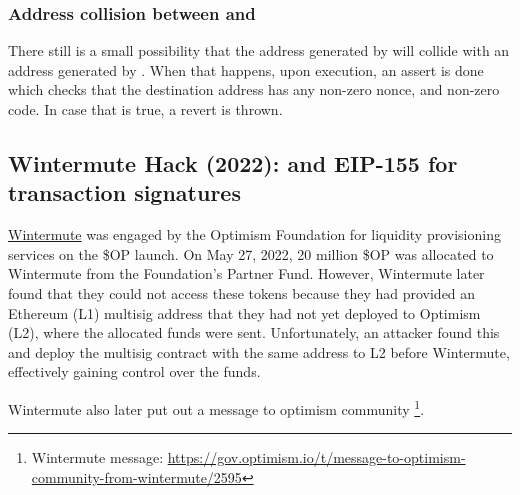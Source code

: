 \subsubsection{Address collision between  and }
There still is a small possibility that the address generated by  will collide with an address generated by . When that happens, upon execution, an assert is done which checks that the destination address has any non-zero nonce, and non-zero code. In case that is true, a revert is thrown.

\subsection{Wintermute Hack (2022):  and EIP-155 for transaction signatures}
\href{https://www.wintermute.com/}{Wintermute} was engaged by the Optimism Foundation for liquidity provisioning services on the \$OP launch. On May 27, 2022, 20 million \$OP was allocated to Wintermute from the Foundation's Partner Fund. However, Wintermute later found that they could not access these tokens because they had provided an Ethereum (L1) multisig address that they had not yet deployed to Optimism (L2), where the allocated funds were sent. Unfortunately, an attacker found this and deploy the multisig contract with the same address to L2 before Wintermute, effectively gaining control over the funds.

Wintermute also later put out a message to optimism community \footnote{Wintermute message: \href{https://gov.optimism.io/t/message-to-optimism-community-from-wintermute/2595}{https://gov.optimism.io/t/message-to-optimism-community-from-wintermute/2595}}.

